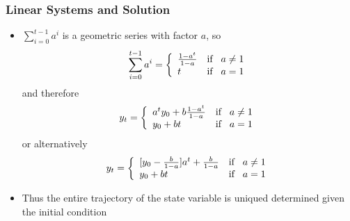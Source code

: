 \documentclass[11pt]{beamer}
\begin{document}

\begin{frame}
\frametitle{Linear Systems and Solution}
\begin{itemize}\itemsep2ex
	\item $\sum_{i=0}^{t-1} a^i$ is a geometric series with factor $a$, so
	\[\sum_{i=0}^{t-1} a^i =   \left\{
	\begin{array}{ll}
     \frac{1-a^t}{1-a} & \text{if} \hspace{0.3cm}a \neq 1 \\
     t & \text{if} \hspace{0.3cm} a = 1 \\
	\end{array}
	\right. \]
	and therefore
	\[y_t =   \left\{
	\begin{array}{ll}
   	a^t y_0 + b \frac{1-a^t}{1-a} & \text{if} \hspace{0.3cm} a \neq 1 \\
   	y_0 + b t & \text{if} \hspace{0.3cm}  a = 1 \\
	\end{array}
	\right. \]
 	or alternatively
 	\[y_t =   \left\{
	\begin{array}{ll}
   	[y_0-\frac{b}{1-a}] a^t + \frac{b}{1-a} & \text{if} \hspace{0.3cm} a \neq 1 \\
   	y_0 + b t & \text{if} \hspace{0.3cm}  a = 1 \\
	\end{array}
	\right. \]
	\item Thus the entire trajectory of the state variable is uniqued determined given the initial condition
\end{itemize}
\end{frame}

\end{document}
